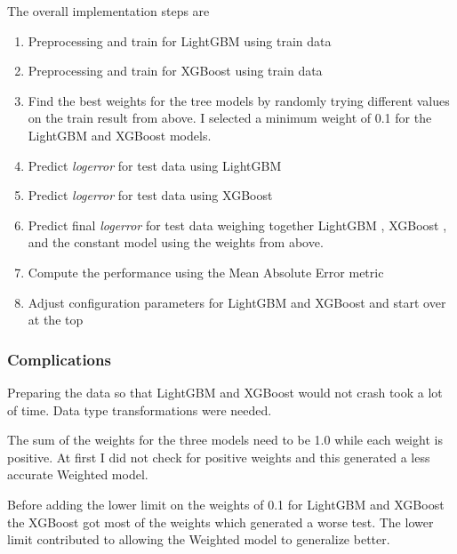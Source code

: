 \documentclass[a4paper]{article}
\begin{document}
The overall implementation steps are
\begin{enumerate}
    \item Preprocessing and train for LightGBM \cite{lightgbm} using train data
    \item Preprocessing and train for XGBoost \cite{xgboost} using train data
    \item Find the best weights for the tree models by randomly trying different values on the train result from above. I selected a minimum weight of 0.1 for the LightGBM \cite{lightgbm} and XGBoost \cite{xgboost} models.
    \item Predict \textit{logerror} for test data using LightGBM \cite{lightgbm}
    \item Predict \textit{logerror} for test data using XGBoost \cite{xgboost}
    \item Predict final \textit{logerror} for test data weighing together LightGBM \cite{lightgbm}, XGBoost \cite{xgboost}, and the constant model using the weights from above.
    \item Compute the performance using the Mean Absolute Error metric
    \item Adjust configuration parameters for LightGBM \cite{lightgbm} and XGBoost \cite{xgboost} and start over at the top
\end{enumerate}


\subsubsection{Complications}
Preparing the data so that LightGBM \cite{lightgbm} and XGBoost \cite{xgboost} would not crash took a lot of time. Data type transformations were needed.

The sum of the weights for the three models need to be 1.0 while each weight is positive. At first I did not check for positive weights and this generated a less accurate Weighted model. 

Before adding the lower limit on the weights of 0.1 for LightGBM \cite{lightgbm} and XGBoost \cite{xgboost} the XGBoost \cite{xgboost} got most of the weights which generated a worse test. The lower limit contributed to allowing the Weighted model to generalize better.
\end{document}
